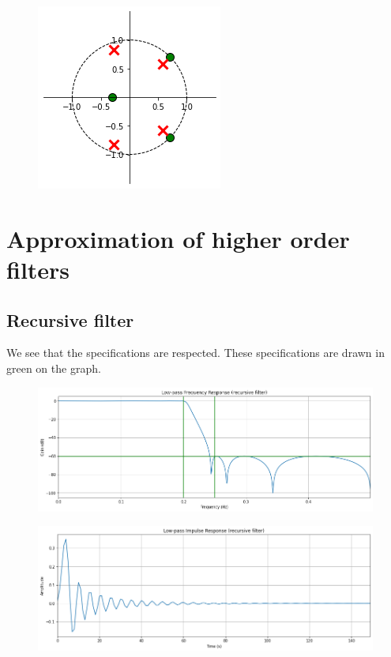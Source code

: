 \documentclass[]{article}
\begin{document}
\begin{figure}[H]
    \centering
    \includegraphics[scale=0.7]{q18.png}
\end{figure}

\pagebreak

\section{Approximation of higher order filters}

\subsection*{Recursive filter}

We see that the specifications are respected.
These specifications are drawn in green on the graph.

\begin{figure}[H]
    \centering
    \includegraphics[scale=0.5]{q21.png}
\end{figure}

\begin{figure}[H]
    \centering
    \includegraphics[scale=0.5]{q22.png}
\end{figure}
\end{document}
